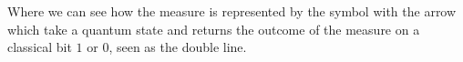 Where we can see how the measure is represented by the symbol with the arrow which take a quantum state and returns the outcome of the measure on a classical bit $1$ or $0$, seen as the double line.




